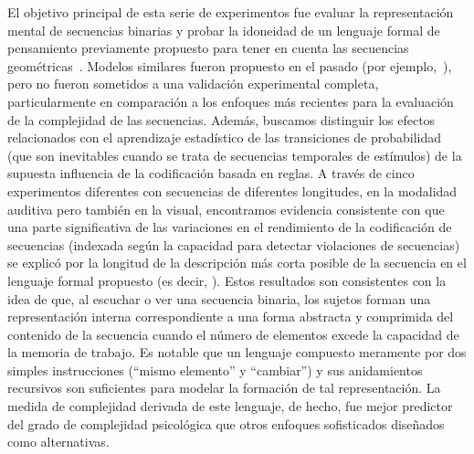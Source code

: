 El objetivo principal de esta serie de experimentos fue evaluar la representación mental de secuencias binarias y probar la idoneidad de un lenguaje formal de pensamiento previamente propuesto para tener en cuenta las secuencias geométricas~\cite{amalric2017language}. Modelos similares fueron propuesto en el pasado (por ejemplo,~\cite{f32,f36,f45}), pero no fueron sometidos a una validación experimental completa, particularmente en comparación a los enfoques más recientes para la evaluación de la complejidad de las secuencias. Además, buscamos distinguir los efectos relacionados con el aprendizaje estadístico de las transiciones de probabilidad (que son inevitables cuando se trata de secuencias temporales de estímulos) de la supuesta influencia de la codificación basada en reglas. A través de cinco experimentos diferentes con secuencias de diferentes longitudes, en la modalidad auditiva pero también en la visual, encontramos evidencia consistente con que una parte significativa de las variaciones en el rendimiento de la codificación de secuencias (indexada según la capacidad para detectar violaciones de secuencias) se explicó por la longitud de la descripción más corta posible de la secuencia en el lenguaje formal propuesto (es decir, \mdlbin). Estos resultados son consistentes con la idea de que, al escuchar o ver una secuencia binaria, los sujetos forman una representación interna correspondiente a una forma abstracta y comprimida del contenido de la secuencia cuando el número de elementos excede la capacidad de la memoria de trabajo. Es notable que un lenguaje compuesto meramente por dos simples instrucciones (``mismo elemento'' y ``cambiar'') y sus anidamientos recursivos son suficientes para modelar la formación de tal representación. La medida de complejidad derivada de este lenguaje, de hecho, fue mejor predictor del grado de complejidad psicológica que otros enfoques sofisticados diseñados como alternativas.


